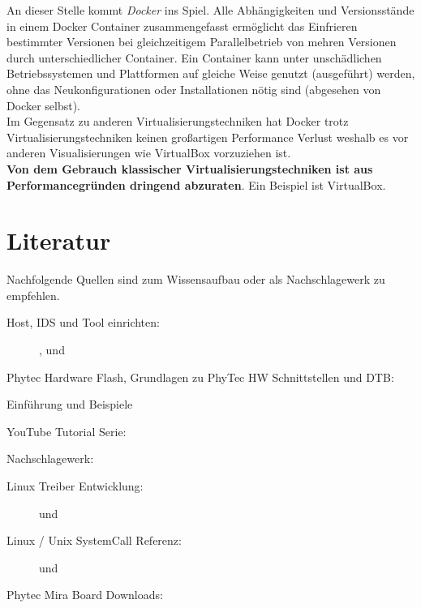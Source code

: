 An dieser Stelle kommt \textit{\gls{Docker}} ins Spiel. Alle Abhängigkeiten und
Versions\-stände in einem \gls{Docker} Container zusammengefasst ermöglicht das
Einfrieren bestimmter Versionen bei gleichzeitigem Parallel\-betrieb von mehren
Versionen durch unterschiedlicher Container. Ein Container kann unter
unschädlichen Betriebssystemen und Plattformen auf gleiche Weise genutzt
(ausgeführt) werden, ohne das Neu\-konfigurationen oder Installationen nötig
sind (abgesehen von Docker selbst).  \\

Im Gegensatz zu anderen Virtualisierungstechniken hat Docker trotz
Virtualisierungstechniken keinen großartigen Performance Verlust weshalb es vor
anderen Visualisierungen wie VirtualBox vorzuziehen ist.  \\

\textbf{Von dem Gebrauch klassischer Virtualisierungstechniken ist aus
    Performance\-gründen dringend abzuraten}. Ein Beispiel ist VirtualBox.


\section{Literatur}%
\label{sec:literatur}

Nachfolgende Quellen sind zum Wissensaufbau oder als Nachschlagewerk zu
empfehlen.

\begin{description}
    \item[Host, IDS und Tool einrichten:] \cite{PhyTec:Development_Guid},
        \cite{Yocto_Eclipse_Plugin} und    \cite{Gonzalez2018:Embedded_Linux_Development_Using_Yocto_Project_Cookbook_2nd}
    \item[Phytec Hardware Flash,  Grundlagen zu PhyTec HW Schnittstellen und
        \gls{DTB}:] \cite[Kapitel
        \textit{Booting\_the\_System} und
        \textit{Updating\_the\_System}][]{
            Pytec:BSP_Manual}
    \item[Einführung und Beispiele] \cite{Gonzalez2018:Embedded_Linux_Development_Using_Yocto_Project_Cookbook_2nd}
    \item[YouTube Tutorial Serie:] \cite[Live Coding with Yocto
        Project][]{Yocto:YouTube}
    \item[Nachschlagewerk:]\cite{Yocto:Mega_Manual}
    \item[Linux Treiber Entwicklung:] \cite{Quade2015} und \cite{Corbet2005}
    \item[Linux / Unix SystemCall Referenz:] \cite{Kerrisk2010} und \cite{Rago2013}
    \item[Phytec Mira Board Downloads:] \cite{PhyTec:Mira_Downloads}

\end{description}













